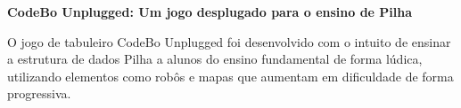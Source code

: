 \item \textbf{CodeBo Unplugged: Um jogo desplugado para o ensino de Pilha}

O jogo de tabuleiro CodeBo Unplugged \cite{de2023codebo} foi desenvolvido com o intuito de
ensinar a estrutura de dados Pilha a alunos do ensino fundamental de forma
lúdica, utilizando elementos como robôs e mapas que aumentam em dificuldade de
forma progressiva. \cite{de2023codebo}


